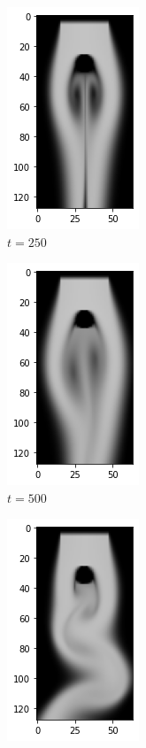 \documentclass[a4paper,12pt,twoside]{report}
\begin{document}
\begin{figure}
	\centering
	\begin{subfigure}{0.18\textwidth}
		\centering
		\includegraphics[scale=0.5]{karmanflow/lsim_density_000250.png}
		\caption{$t=250$}
	\end{subfigure}
	\begin{subfigure}{0.18\textwidth}
		\centering
		\includegraphics[scale=0.5]{karmanflow/lsim_density_000500.png}
		\caption{$t=500$}
	\end{subfigure}
	\begin{subfigure}{0.18\textwidth}
		\centering
		\includegraphics[scale=0.5]{karmanflow/lsim_density_001000.png}

\end{subfigure}
\end{figure}
\end{document}

